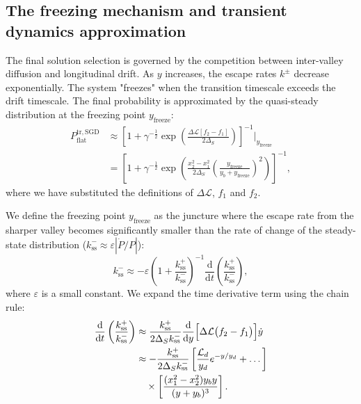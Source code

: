 \documentclass[aps,prx,reprint,superscriptaddress,longbibliography,nofootinbib,floatfix]{revtex4-2}
\begin{document}
\subsection{The freezing mechanism and transient dynamics approximation} \label{sec:appendix4}

The final solution selection is governed by the competition between inter-valley diffusion and longitudinal drift. As $y$ increases, the escape rates $k^{\pm}$ decrease exponentially. The system "freezes" when the transition timescale exceeds the drift timescale. The final probability is approximated by the quasi-steady distribution at the freezing point $y_\mathrm{freeze}$:
\begin{equation}
\label{eq:tr_SGD_original_a}
\begin{split}
    P_{\mathrm{flat}}^{\mathrm{tr,SGD}}
    &\approx \left[1 + \gamma^{-\frac{1}{2}} \exp\left( \frac{\Delta \mathcal{L} [f_2 - f_1]}{2 \Delta_S} \right) \right]^{-1} \bigg|_{y_\mathrm{freeze}} \\
    &= \left[1+\gamma^{-\frac{1}{2}} \exp\!\left(\frac{x_2^2-x_1^2}{2 \Delta_S} \left(\frac{y_\mathrm{freeze}}{y_b+y_\mathrm{freeze}}\right)^2\right)\right]^{-1},
\end{split}
\end{equation}
where we have substituted the definitions of $\Delta \mathcal{L}$, $f_1$ and $f_2$.

We define the freezing point $y_{\mathrm{freeze}}$ as the juncture where the escape rate from the sharper valley becomes significantly smaller than the rate of change of the steady-state distribution ($k_\mathrm{ss}^{-} \approx \varepsilon |\dot P/P|$):
\begin{equation}
 k_\mathrm{ss}^{-} \approx -\varepsilon\left(1+\frac{k_\mathrm{ss}^{+}}{k_\mathrm{ss}^{-}}\right)^{-1}\frac{\mathrm{d}}{\mathrm{d}t}\left(\frac{k_\mathrm{ss}^{+}}{k_\mathrm{ss}^{-}}\right),
    \label{eq:freezing_criterion}
\end{equation}
where $\varepsilon$ is a small constant. We expand the time derivative term using the chain rule:
\begin{equation}
\begin{split}
    \frac{\mathrm{d}}{\mathrm{d}t} \left( \frac{k_\mathrm{ss}^{+}}{k_\mathrm{ss}^{-}} \right)
    &\approx \frac{k_\mathrm{ss}^{+}}{2\Delta_S k_\mathrm{ss}^{-}} \frac{\mathrm{d}}{\mathrm{d}y}\Bigl[ \Delta\mathcal{L} \bigl( f_2-f_1 \bigr) \Bigr] \dot{y} \\
    &\approx -\frac{k_\mathrm{ss}^{+}}{2\Delta_S k_\mathrm{ss}^{-}} \left[ \frac{\mathcal{L}_d}{y_d} e^{-y/y_d} +\dots \right] \\
    &\quad \times \left[ \frac{(x_1^2-x_2^2)y_b y}{(y+y_b)^3} \right].
\end{split}
\end{equation}
\end{document}
